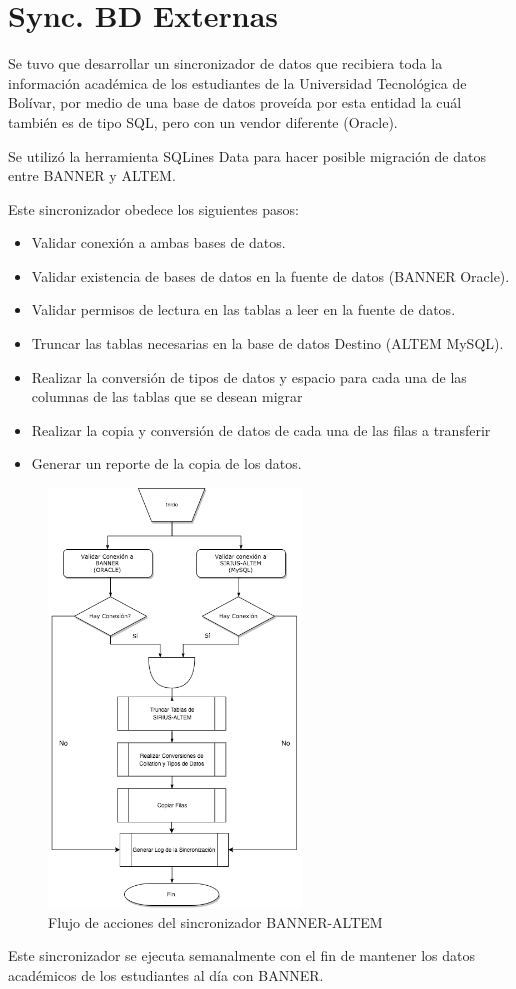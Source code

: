 \section{Sync. BD Externas}
Se tuvo que desarrollar un sincronizador de datos que recibiera toda la información académica de los estudiantes de la Universidad Tecnológica de Bolívar, por medio de una base de datos proveída por esta entidad la cuál también es de tipo SQL, pero con un vendor diferente (Oracle).

Se utilizó la herramienta SQLines Data para hacer posible migración de datos entre BANNER y ALTEM. 

Este sincronizador obedece los siguientes pasos:

\begin{itemize}
    \item Validar conexión a ambas bases de datos.
    \item Validar existencia de bases de datos en la fuente de datos (BANNER Oracle).
    \item Validar permisos de lectura en las tablas a leer en la fuente de datos.
    \item Truncar las tablas necesarias en la base de datos Destino (ALTEM MySQL).
    \item Realizar la conversión de tipos de datos y espacio para cada una de las columnas de las tablas que se desean migrar
    \item Realizar la copia y conversión de datos de cada una de las filas a transferir
    \item Generar un reporte de la copia de los datos.
\end{itemize}

\begin{figure}[H]
    \centering
    \includegraphics[width=0.6\textwidth]{img/db_sync.png}
    \caption{Flujo de acciones del sincronizador BANNER-ALTEM }
\end{figure}


Este sincronizador se ejecuta semanalmente con el fin de mantener los datos académicos de los estudiantes al día con BANNER.